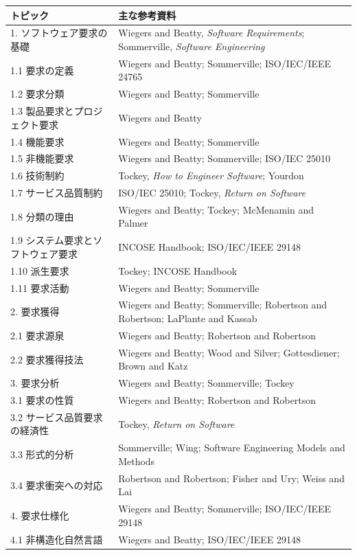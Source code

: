 \documentclass[uplatex,10pt,dvipdfmx,nomag]{jsarticle}
\begin{document}
\small
\begin{longtable}{@{}p{.38\linewidth}p{.55\linewidth}@{}}
\toprule
トピック & 主な参考資料 \\
\midrule
\endhead
1. ソフトウェア要求の基礎 & Wiegers and Beatty, \textit{Software Requirements}; Sommerville, \textit{Software Engineering} \\
1.1 要求の定義 & Wiegers and Beatty; Sommerville; ISO/IEC/IEEE 24765 \\
1.2 要求分類 & Wiegers and Beatty; Sommerville \\
1.3 製品要求とプロジェクト要求 & Wiegers and Beatty \\
1.4 機能要求 & Wiegers and Beatty; Sommerville \\
1.5 非機能要求 & Wiegers and Beatty; Sommerville; ISO/IEC 25010 \\
1.6 技術制約 & Tockey, \textit{How to Engineer Software}; Yourdon \\
1.7 サービス品質制約 & ISO/IEC 25010; Tockey, \textit{Return on Software} \\
1.8 分類の理由 & Wiegers and Beatty; Tockey; McMenamin and Palmer \\
1.9 システム要求とソフトウェア要求 & INCOSE Handbook; ISO/IEC/IEEE 29148 \\
1.10 派生要求 & Tockey; INCOSE Handbook \\
1.11 要求活動 & Wiegers and Beatty; Sommerville \\
2. 要求獲得 & Wiegers and Beatty; Sommerville; Robertson and Robertson; LaPlante and Kassab \\
2.1 要求源泉 & Wiegers and Beatty; Robertson and Robertson \\
2.2 要求獲得技法 & Wiegers and Beatty; Wood and Silver; Gottesdiener; Brown and Katz \\
3. 要求分析 & Wiegers and Beatty; Sommerville; Tockey \\
3.1 要求の性質 & Wiegers and Beatty; Robertson and Robertson \\
3.2 サービス品質要求の経済性 & Tockey, \textit{Return on Software} \\
3.3 形式的分析 & Sommerville; Wing; Software Engineering Models and Methods \\
3.4 要求衝突への対応 & Robertson and Robertson; Fisher and Ury; Weiss and Lai \\
4. 要求仕様化 & Wiegers and Beatty; Sommerville; ISO/IEC/IEEE 29148 \\
4.1 非構造化自然言語 & Wiegers and Beatty; ISO/IEC/IEEE 29148 \\

\end{longtable}
\end{document}
